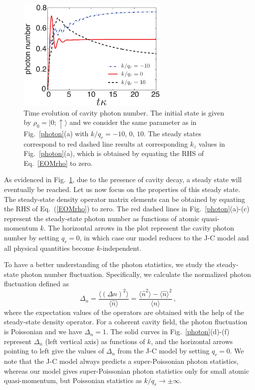 \documentclass[atoms,article,submit,moreauthors,pdftex,12pt,a4paper]{mdpi}
\begin{document}
\begin{figure}[htp]
\includegraphics[width=0.65\textwidth]{photon_evolution}\caption{Time evolution of cavity photon number. The initial state is given by $\rho_0=|0;\uparrow\rangle$ and we consider the same parameter as in Fig.~\ref{photon}(a) with $k/q_r=-10,\,0,\,10$. The steady states correspond to red dashed line results at corresponding $k_z$ values in Fig.~\ref{photon}(a), which is obtained by equating the RHS of Eq.~\ref{EOMrho} to zero. }\label{evo}
\end{figure}

As evidenced in Fig.~\ref{evo}, due to the presence of cavity decay, a steady state will eventually be reached. Let us now focus on the properties of this steady state. The steady-state density operator matrix elements can be obtained by equating the RHS of Eq.~(\ref{EOMrho}) to zero. The red dashed lines in Fig.~\ref{photon}(a)-(c) represent the steady-state photon number as functions of atomic quasi-momentum $k$. The horizontal arrows in the plot represent the cavity photon number by setting $q_r=0$, in which case our model reduces to the J-C model and all physical quantities become $k$-independent. 

To have a better understanding of the photon statistics, we study the steady-state photon number fluctuation. Specifically, we calculate the normalized photon fluctuation defined as 
\[\Delta_n = \frac{\langle(\Delta n)^{2}\rangle}{\langle \hat{n}\rangle}=\frac{\langle \hat{n}^{2}\rangle-\langle \hat{n}\rangle^{2}}{\langle n\rangle} \,,\] 
where the expectation values of the operators are obtained with the help of the steady-state density operator. For a coherent cavity field, the photon fluctuation is Poissonian and we have $\Delta_n=1$.
The solid curves in Fig.~\ref{photon}(d)-(f) represent $\Delta_n$ (left vertical axis) as functions of $k$, and the horizontal arrows pointing to left give the values of $\Delta_n$ from the J-C model by setting $q_r=0$. We note that the J-C model always predicts a super-Poissonian photon statistics, whereas our model gives super-Poissonian photon statistics only for small atomic quasi-momentum, but Poissonian statistics as $k/q_r \longrightarrow \pm \infty$. 
\end{document}
